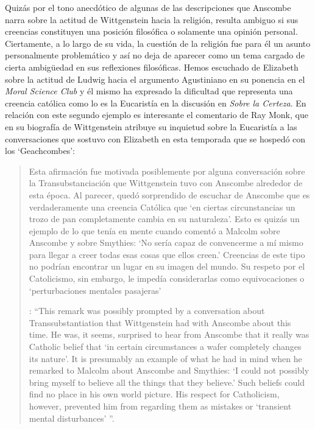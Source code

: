 Quizás por el tono anecdótico de algunas de las descripciones que Anscombe narra sobre la actitud de Wittgenstein hacia la religión, resulta ambiguo si sus creencias constituyen una posición filosófica o solamente una opinión personal. Ciertamente, a lo largo de su vida, la cuestión de la religión fue para él un asunto personalmente problemático y así no deja de aparecer como un tema cargado de cierta ambigüedad en sus reflexiones filosóficas. Hemos escuchado de Elizabeth sobre la actitud de Ludwig hacia el argumento Agustiniano en su ponencia en el \emph{Moral Science Club} y él mismo ha expresado la dificultad que representa una creencia católica como lo es la Eucaristía en la discusión en \emph{Sobre la Certeza}. En relación con este segundo ejemplo es interesante el comentario de Ray Monk, que en su biografía de Wittgenstein atribuye su inquietud sobre la Eucaristía a las conversaciones que sostuvo con Elizabeth en esta temporada que se hospedó con los `Geachcombes': \blockquote[{\Cite[572]{monk1991duty}}: \enquote{This remark  was possibly prompted by a conversation about Transsubstantiation  that Wittgenstein had with Anscombe about this time. He was, it seems, surprised to hear from Anscombe that it really was Catholic belief that ‘in certain circumstances a wafer completely changes its nature’. It is presumably an example of what he had in mind when he remarked to Malcolm about Anscombe and Smythies: ‘I could not possibly bring myself to believe all the things that they believe.’ Such beliefs could find no place in his own world picture. His respect for Catholicism, however, prevented him from regarding them as mistakes or ‘transient mental disturbances’ }.]{Esta afirmación  fue motivada posiblemente por alguna conversación sobre la Transubstanciación que Wittgenstein tuvo con Anscombe alrededor de esta época. Al parecer, quedó sorprendido de escuchar de Anscombe que es verdaderamente una creencia Católica que `en ciertas circunstancias un trozo de pan completamente cambia en su naturaleza'. Esto es quizás un ejemplo de lo que tenía en mente cuando comentó a Malcolm sobre Anscombe y sobre Smythies: `No sería capaz de convencerme a mí mismo para llegar a creer todas esas cosas que ellos creen.' Creencias de este tipo no podrían encontrar un lugar en su imagen del mundo. Su respeto por el Catolicismo, sin embargo, le impedía considerarlas como equivocaciones o `perturbaciones mentales pasajeras' }.

